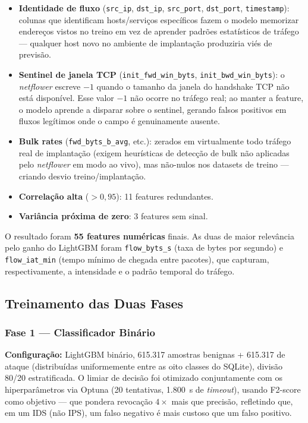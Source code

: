 \documentclass[12pt]{article}
\begin{document}
\begin{itemize}
  \item \textbf{Identidade de fluxo} (\texttt{src\_ip}, \texttt{dst\_ip},
    \texttt{src\_port}, \texttt{dst\_port}, \texttt{timestamp}): colunas que
    identificam hosts/serviços específicos fazem o modelo memorizar endereços
    vistos no treino em vez de aprender padrões estatísticos de tráfego —
    qualquer host novo no ambiente de implantação produziria viés de previsão.

  \item \textbf{Sentinel de janela TCP} (\texttt{init\_fwd\_win\_byts},
    \texttt{init\_bwd\_win\_byts}): o \textit{netflower} escreve $-1$ quando o
    tamanho da janela do handshake TCP não está disponível. Esse valor $-1$ não
    ocorre no tráfego real; ao manter a feature, o modelo aprende a disparar
    sobre o sentinel, gerando falsos positivos em fluxos legítimos onde o campo
    é genuinamente ausente.

  \item \textbf{Bulk rates} (\texttt{fwd\_byts\_b\_avg}, etc.): zerados em
    virtualmente todo tráfego real de implantação (exigem heurísticas de
    detecção de bulk não aplicadas pelo \textit{netflower} em modo ao vivo),
    mas não-nulos nos datasets de treino — criando desvio treino/implantação.

  \item \textbf{Correlação alta} ($> 0{,}95$): 11 features redundantes.
  \item \textbf{Variância próxima de zero}: 3 features sem sinal.
\end{itemize}

O resultado foram \textbf{55 features numéricas} finais. As duas de maior
relevância pelo ganho do LightGBM foram \texttt{flow\_byts\_s} (taxa de bytes
por segundo) e \texttt{flow\_iat\_min} (tempo mínimo de chegada entre pacotes),
que capturam, respectivamente, a intensidade e o padrão temporal do tráfego.

\subsection{Treinamento das Duas Fases}

\subsubsection{Fase 1 — Classificador Binário}

\textbf{Configuração:} LightGBM binário, 615.317 amostras benignas + 615.317
de ataque (distribuídas uniformemente entre as oito classes do SQLite), divisão
80/20 estratificada. O limiar de decisão foi otimizado conjuntamente com os
hiperparâmetros via Optuna (20 tentativas, 1.800~s de \textit{timeout}),
usando F2-score como objetivo — que pondera revocação $4\times$ mais que
precisão, refletindo que, em um IDS (não IPS), um falso negativo é mais
custoso que um falso positivo.
\end{document}
